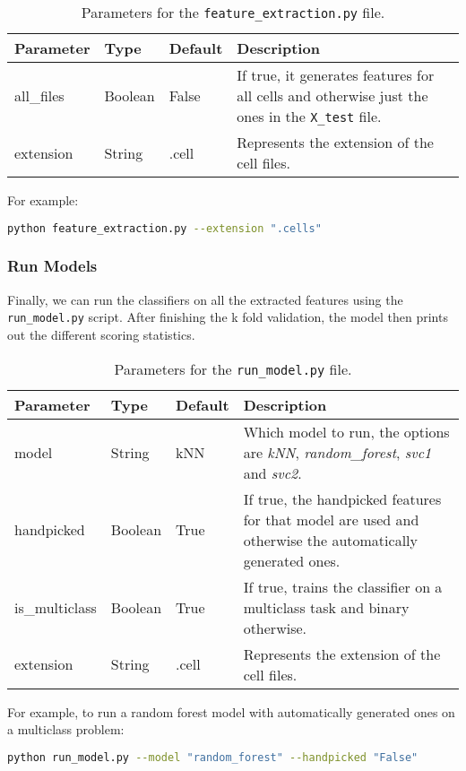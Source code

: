 \begin{table}[ht]
  \centering
  \begin{tabular}{ l | l | l | p{} }
    \textbf{Parameter} & \textbf{Type} & \textbf{Default} & \textbf{Description} \\ \hline \hline
    all\_files & Boolean & False & If true, it generates features for all cells and otherwise just the ones in the \texttt{X\_test} file. \\ \hline
    extension & String & .cell & Represents the extension of the cell files.
  \end{tabular}
  \caption{Parameters for the \texttt{feature\_extraction.py} file.}
\end{table}

\noindent
For example:
\begin{lstlisting}[language=Bash]
python feature_extraction.py --extension ".cells"
\end{lstlisting}

\subsubsection{Run Models}

Finally, we can run the classifiers on all the extracted features using the \texttt{run\_model.py} script.
After finishing the k fold validation, the model then prints out the different scoring statistics.

\begin{table}[ht]
  \centering
  \begin{tabular}{ l | l | l | p{} }
    \textbf{Parameter} & \textbf{Type} & \textbf{Default} & \textbf{Description} \\ \hline \hline
    model & String & kNN & Which model to run, the options are \textit{kNN}, \textit{random\_forest}, \textit{svc1} and \textit{svc2}. \\ \hline
    handpicked & Boolean & True & If true, the handpicked features for that model are used and otherwise the automatically generated ones. \\ \hline
    is\_multiclass & Boolean & True & If true, trains the classifier on a multiclass task and binary otherwise. \\ \hline
    extension & String & .cell & Represents the extension of the cell files.
  \end{tabular}
  \caption{Parameters for the \texttt{run\_model.py} file.}
\end{table}

\noindent
For example, to run a random forest model with automatically generated ones on a multiclass problem:
\begin{lstlisting}[language=Bash]
python run_model.py --model "random_forest" --handpicked "False"
\end{lstlisting}

\endgroup
